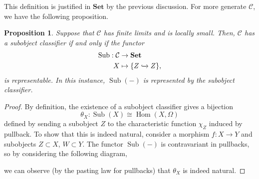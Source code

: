 \documentclass{amsart}
\DeclareMathOperator{\Sub}{Sub}
\DeclareMathOperator{\Hom}{Hom}
\newtheorem{proposition}[theorem]{Proposition}
\theoremstyle{definition}
\theoremstyle{remark}
\begin{document}
This definition is justified in $\mathbf{Set}$ by the previous discussion. For
more generate $\mathcal{C}$, we have the following proposition.

\begin{proposition}
    Suppose that $\mathcal{C}$ has finite limits and is locally small. Then,
    $\mathcal{C}$ has a subobject classifier if and only if the functor
    \begin{align*}
        \Sub : \mathcal{C} &\to \mathbf{Set} \\
        X &\mapsto \{Z \xhookrightarrow{} Z \},
    \end{align*}
    is representable. In this instance, $\Sub(-)$ is represented by the
    subobject classifier.
\end{proposition}

\begin{proof}
    By definition, the existence of a subobject classifier gives a bijection
    \[
        \theta_X : \Sub(X) \cong \Hom(X, \Omega)
    \]
    defined by sending a subobject $Z$ to the characteristic function $\chi_Z$
    induced by pullback. To show that this is indeed natural, consider a
    morphism $f : X \to Y$ and subobjects $Z \subset X$, $W \subset Y$. The
    functor $\Sub(-)$ is contravariant in pullbacks, so by considering the
    following diagram,
    \begin{center}
    \end{center}
    we can observe (by the pasting law for pullbacks) that $\theta_X$ is indeed
    natural.


\end{proof}
\end{document}
